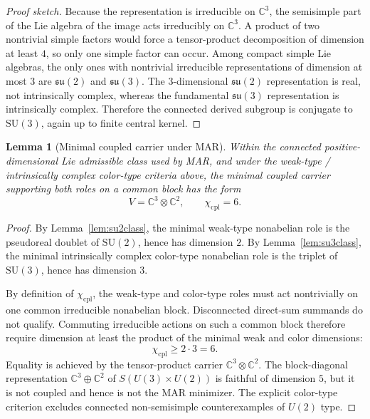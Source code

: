 \documentclass[11pt]{article}
\newtheorem{lemma}[theorem]{Lemma}
\newcommand{\SU}{\mathrm{SU}}
\begin{document}
\begin{proof}[Proof sketch]
Because the representation is irreducible on $\mathbb C^3$, the semisimple part of the Lie algebra of the image acts irreducibly on $\mathbb C^3$. A product of two nontrivial simple factors would force a tensor-product decomposition of dimension at least $4$, so only one simple factor can occur. Among compact simple Lie algebras, the only ones with nontrivial irreducible representations of dimension at most $3$ are $\mathfrak{su}(2)$ and $\mathfrak{su}(3)$. The $3$-dimensional $\mathfrak{su}(2)$ representation is real, not intrinsically complex, whereas the fundamental $\mathfrak{su}(3)$ representation is intrinsically complex. Therefore the connected derived subgroup is conjugate to $\SU(3)$, again up to finite central kernel.
\end{proof}

\begin{lemma}[Minimal coupled carrier under MAR]\label{lem:carrier}
Within the connected positive-dimensional Lie admissible class used by MAR, and under the weak-type / intrinsically complex color-type criteria above, the minimal coupled carrier supporting both roles on a common block has the form
\[
V=\mathbb C^3\otimes \mathbb C^2,
\qquad
\chi_{\mathrm{cpl}}=6.
\]
\end{lemma}

\begin{proof}
By Lemma~\ref{lem:su2class}, the minimal weak-type nonabelian role is the pseudoreal doublet of $\SU(2)$, hence has dimension $2$. By Lemma~\ref{lem:su3class}, the minimal intrinsically complex color-type nonabelian role is the triplet of $\SU(3)$, hence has dimension $3$.

By definition of $\chi_{\mathrm{cpl}}$, the weak-type and color-type roles must act nontrivially on one common irreducible nonabelian block. Disconnected direct-sum summands do not qualify. Commuting irreducible actions on such a common block therefore require dimension at least the product of the minimal weak and color dimensions:
\[
\chi_{\mathrm{cpl}}\ge 2\cdot 3=6.
\]
Equality is achieved by the tensor-product carrier $\mathbb C^3\otimes\mathbb C^2$. The block-diagonal representation $\mathbb C^3\oplus \mathbb C^2$ of $S(U(3)\times U(2))$ is faithful of dimension $5$, but it is not coupled and hence is not the MAR minimizer. The explicit color-type criterion excludes connected non-semisimple counterexamples of $U(2)$ type.
\end{proof}
\end{document}
